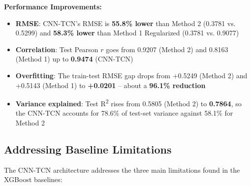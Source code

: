 \begin{table}[H]
\centering
\caption{Comprehensive Comparison of All Methods at 3-Month Lead Time}
\label{tab:all_methods_comparison}
\renewcommand{\arraystretch}{1.2}
\end{table}

\textbf{Performance Improvements:}
\begin{itemize}
    \item \textbf{RMSE}: CNN-TCN's RMSE is \textbf{55.8\% lower} than Method 2 (0.3781 vs. 0.5299) and \textbf{58.3\% lower} than Method 1 Regularized (0.3781 vs. 0.9077)
    \item \textbf{Correlation}: Test Pearson $r$ goes from 0.9207 (Method 2) and 0.8163 (Method 1) up to \textbf{0.9474} (CNN-TCN)
    \item \textbf{Overfitting}: The train-test RMSE gap drops from +0.5249 (Method 2) and +0.5143 (Method 1) to \textbf{+0.0201} -- about a \textbf{96.1\% reduction}
    \item \textbf{Variance explained}: Test R\textsuperscript{2} rises from 0.5805 (Method 2) to \textbf{0.7864}, so the CNN-TCN accounts for 78.6\% of test-set variance against 58.1\% for Method 2
\end{itemize}

\subsection{Addressing Baseline Limitations}
The CNN-TCN architecture addresses the three main limitations found in the XGBoost baselines:

